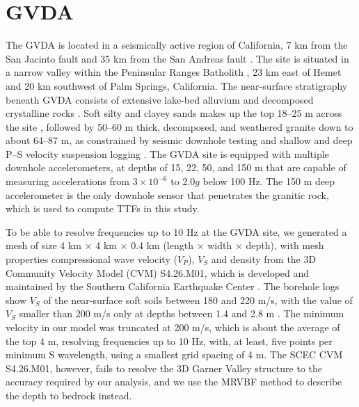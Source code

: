 {\section{GVDA}\label{etf:gvda}
The GVDA is located in a seismically active region of California, 7 km from the San Jacinto fault and 35 km from the San Andreas fault \citep[see \cref{fig:etf-1};][]{archuletaGarnerValleyDownhole1992}. The site is situated in a narrow valley within the Peninsular Ranges Batholith \citep{bonillaBoreholeResponseStudies2002}, 23 km east of Hemet and 20 km southwest of Palm Springs, California. The near-surface stratigraphy beneath GVDA consists of extensive lake-bed alluvium and decomposed crystalline rocks \citep{hillGeologyGarnerValley1981}. Soft silty and clayey sands makes up the top 18–25 m across the site \citep{steidlWhatReferenceSite1996}, followed by 50–60 m thick, decomposed, and weathered granite down to about 64–87 m, as constrained by seismic downhole testing and shallow and deep P–S velocity suspension logging \citep{gibbsNearsurfaceSwaveVelocities1989,stellerNewBoreholeGeophysical1996}. The GVDA site is equipped with multiple downhole accelerometers, at depths of 15, 22, 50, and 150 m that are capable of measuring accelerations from $3 \times 10^{-6}$ to $2.0g$ below 100 Hz. The 150 m deep accelerometer is the only downhole sensor that penetrates the granitic rock, which is used to compute TTFs in this study.

To be able to resolve frequencies up to 10 Hz at the GVDA site, we generated a mesh of size 4 km × 4 km × 0.4 km (length × width × depth), with mesh properties compressional wave velocity ($V_P$), $V_S$ and density from the 3D Community Velocity Model (CVM) S4.26.M01, which is developed and maintained by the Southern California Earthquake Center \citep[SCEC;][]{smallSCECUnifiedCommunity2017}. The borehole logs show $V_S$ of the near-surface soft soils between 180 and 220 m/s, with the value of $V_S$ smaller than 200 m/s only at depths between 1.4 and 2.8 m \citep{stellerNewBoreholeGeophysical1996}. The minimum velocity in our model was truncated at 200 m/s, which is about the average of the top 4 m, resolving frequencies up to 10 Hz, with, at least, five points per minimum S wavelength, using a smallest grid spacing of 4 m. The SCEC CVM S4.26.M01, however, fails to resolve the 3D Garner Valley structure to the accuracy required by our analysis, and we use the MRVBF method to describe the depth to bedrock instead.

}
